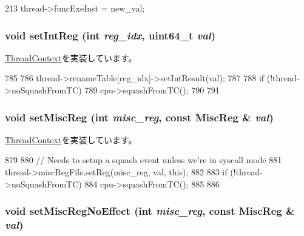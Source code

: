 \begin{DoxyCode}
213         { thread->funcExeInst = new_val; }
\end{DoxyCode}
\hypertarget{classOzoneCPU_1_1OzoneTC_abc264e8ee37c6bd7d7b5759b97c34356}{
\subsubsection[{setIntReg}]{\setlength{\rightskip}{0pt plus 5cm}void setIntReg (int {\em reg\_\-idx}, \/  uint64\_\-t {\em val})}}
\label{classOzoneCPU_1_1OzoneTC_abc264e8ee37c6bd7d7b5759b97c34356}


\hyperlink{classThreadContext_a995ac11ab79af59e135d473df10c72da}{ThreadContext}を実装しています。


\begin{DoxyCode}
785 {
786     thread->renameTable[reg_idx]->setIntResult(val);
787 
788     if (!thread->noSquashFromTC) {
789         cpu->squashFromTC();
790     }
791 }
\end{DoxyCode}
\hypertarget{classOzoneCPU_1_1OzoneTC_a1877dde4f3eb17a8b7d33ea40176c148}{
\subsubsection[{setMiscReg}]{\setlength{\rightskip}{0pt plus 5cm}void setMiscReg (int {\em misc\_\-reg}, \/  const {\bf MiscReg} \& {\em val})}}
\label{classOzoneCPU_1_1OzoneTC_a1877dde4f3eb17a8b7d33ea40176c148}


\hyperlink{classThreadContext_a074166dc2fe3c4aea3ad588ed9883c51}{ThreadContext}を実装しています。


\begin{DoxyCode}
879 {
880     // Needs to setup a squash event unless we're in syscall mode
881     thread->miscRegFile.setReg(misc_reg, val, this);
882 
883     if (!thread->noSquashFromTC) {
884         cpu->squashFromTC();
885     }
886 }
\end{DoxyCode}
\hypertarget{classOzoneCPU_1_1OzoneTC_a763517aaea2f3decbc1ef9d064216b6f}{
\subsubsection[{setMiscRegNoEffect}]{\setlength{\rightskip}{0pt plus 5cm}void setMiscRegNoEffect (int {\em misc\_\-reg}, \/  const {\bf MiscReg} \& {\em val})}}
\label{classOzoneCPU_1_1OzoneTC_a763517aaea2f3decbc1ef9d064216b6f}


